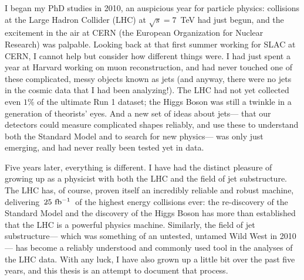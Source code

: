 
I began my PhD studies in 2010, an auspicious year for particle physics: collisions at the Large Hadron Collider (LHC) at $\sqrt{s} = 7$~TeV had just begun, and the excitement in the air at CERN (the European Organization for Nuclear Research) was palpable. Looking back at that first summer working for SLAC at CERN, I cannot help but consider how different things were. I had just spent a year at Harvard working on muon reconstruction, and had never touched one of these complicated, messy objects known as jets (and anyway, there were no jets in the cosmic data that I had been analyzing!). The LHC had not yet collected even $1\%$ of the ultimate Run 1 dataset; the Higgs Boson was still a twinkle in a generation of theorists' eyes. And a new set of ideas about jets--- that our detectors could measure complicated shapes reliably, and use these to understand both the Standard Model and to search for new physics--- was only just emerging, and had never really been tested yet in data. 

Five years later, everything is different. I have had the distinct pleasure of growing up as a physicist with both the LHC and the field of jet substructure. The LHC has, of course, proven itself an incredibly reliable and robust machine, delivering~$25~\mbox{fb$^{-1}$}$~of the highest energy collisions ever: the re-discovery of the Standard Model and the discovery of the Higgs Boson has more than established that the LHC is a powerful physics machine. Similarly, the field of jet substructure--- which was something of an untested, untamed Wild West in 2010--- has become a reliably understood  and commonly used tool in the analyses of the LHC data. With any luck, I have also grown up a little bit over the past five years, and this thesis is an attempt to document that process.